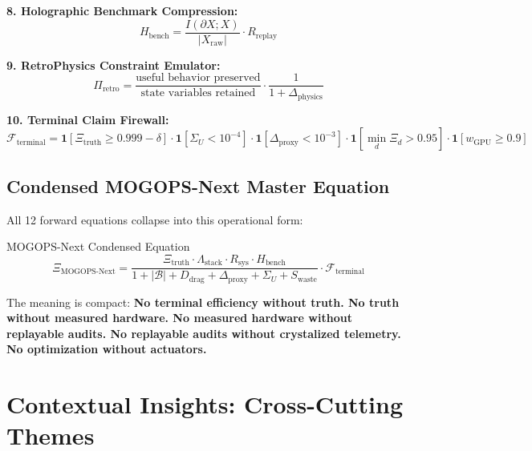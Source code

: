 \documentclass[11pt,a4paper]{article}
\theoremstyle{definition}
\begin{document}
\textbf{8. Holographic Benchmark Compression:}
\begin{equation}
H_{\text{bench}} = \frac{I(\partial X;X)}{|X_{\text{raw}}|}\cdot R_{\text{replay}}
\end{equation}

\textbf{9. RetroPhysics Constraint Emulator:}
\begin{equation}
\Pi_{\text{retro}} = \frac{\text{useful behavior preserved}}{\text{state variables retained}}\cdot\frac{1}{1+\Delta_{\text{physics}}}
\end{equation}

\textbf{10. Terminal Claim Firewall:}
\begin{equation}
\mathcal{F}_{\text{terminal}} = \mathbf{1}[\Xi_{\text{truth}}\geq 0.999-\delta]\cdot\mathbf{1}[\Sigma_U<10^{-4}]\cdot\mathbf{1}[\Delta_{\text{proxy}}<10^{-3}]\cdot\mathbf{1}[\min_d\Xi_d>0.95]\cdot\mathbf{1}[w_{\text{GPU}}\geq 0.9]
\end{equation}

\subsection{Condensed MOGOPS-Next Master Equation}

All 12 forward equations collapse into this operational form:

\begin{masterbox}{MOGOPS-Next Condensed Equation}
\begin{equation}\label{eq:mogops-next}
\boxed{\Xi_{\text{MOGOPS-Next}} = \frac{\Xi_{\text{truth}}\cdot\Lambda_{\text{stack}}\cdot R_{\text{sys}}\cdot H_{\text{bench}}}{1+|\mathcal{B}|+D_{\text{drag}}+\Delta_{\text{proxy}}+\Sigma_U+S_{\text{waste}}}\cdot\mathcal{F}_{\text{terminal}}}
\end{equation}
\end{masterbox}

The meaning is compact: \textbf{No terminal efficiency without truth. No truth without measured hardware. No measured hardware without replayable audits. No replayable audits without crystalized telemetry. No optimization without actuators.}

\section{Contextual Insights: Cross-Cutting Themes}\label{sec:contextual}
\end{document}

